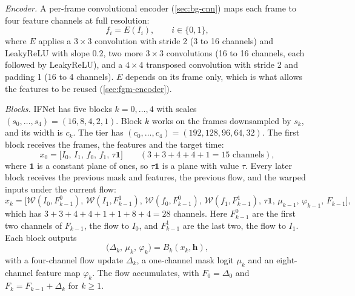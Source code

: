 \emph{Encoder.} A per-frame convolutional encoder (\cref{sec:bg-cnn}) maps each frame to four feature channels at full resolution:
\begin{equation}
f_i=E(I_i),\qquad i\in\{0,1\},\label{eq:fgm-enc}
\end{equation}
where $E$ applies a $3\times3$ convolution with stride 2 (3 to 16 channels) and LeakyReLU with slope 0.2, two more $3\times3$ convolutions (16 to 16 channels, each followed by LeakyReLU), and a $4\times4$ transposed convolution with stride 2 and padding 1 (16 to 4 channels). $E$ depends on its frame only, which is what allows the features to be reused (\cref{sec:fgm-encoder}).

\emph{Blocks.} IFNet has five blocks $k=0,\dots,4$ with scales $(s_0,\dots,s_4)=(16,8,4,2,1)$. Block $k$ works on the frames downsampled by $s_k$, and its width is $c_k$. The  tier has $(c_0,\dots,c_4)=(192,128,96,64,32)$. The first block receives the frames, the features and the target time:
\begin{equation}
x_0=\big[I_0,\,I_1,\,f_0,\,f_1,\,\tau\mathbf 1\big]\qquad(3+3+4+4+1=15\text{ channels}),\label{eq:fgm-block0}
\end{equation}
where $\mathbf 1$ is a constant plane of ones, so $\tau\mathbf 1$ is a plane with value $\tau$. Every later block receives the previous mask and features, the previous flow, and the warped inputs under the current flow:
\begin{equation}
x_k=\big[\mathcal W(I_0,F_{k-1}^0),\,\mathcal W(I_1,F_{k-1}^1),\,\mathcal W(f_0,F_{k-1}^0),\,\mathcal W(f_1,F_{k-1}^1),\,\tau\mathbf 1,\,\mu_{k-1},\,\varphi_{k-1},\,F_{k-1}\big],\label{eq:fgm-blockk}
\end{equation}
which has $3+3+4+4+1+1+8+4=28$ channels. Here $F_{k-1}^0$ are the first two channels of $F_{k-1}$, the flow to $I_0$, and $F_{k-1}^1$ are the last two, the flow to $I_1$. Each block outputs
\begin{equation}
\big(\Delta_k,\,\mu_k,\,\varphi_k\big)=B_k(x_k,\mathbf h),\label{eq:fgm-blockout}
\end{equation}
with a four-channel flow update $\Delta_k$, a one-channel mask logit $\mu_k$ and an eight-channel feature map $\varphi_k$. The flow accumulates, with $F_0=\Delta_0$ and $F_k=F_{k-1}+\Delta_k$ for $k\geq1$.

